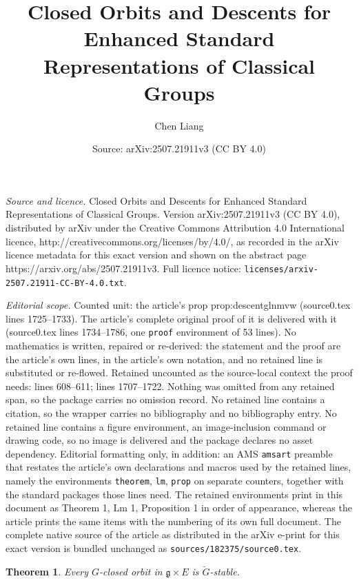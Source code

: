 \documentclass[10pt,a4paper]{amsart}
\title{Closed Orbits and Descents for Enhanced Standard Representations of Classical Groups}
\author{Chen Liang}
\date{Source: arXiv:2507.21911v3 (CC BY 4.0)}
\newtheorem{theorem}{Theorem}
\newcommand{\g}{\mathfrak g}
\begin{document}
\maketitle

\noindent\emph{Source and licence.} Closed Orbits and Descents for Enhanced Standard Representations of Classical Groups. Version arXiv:2507.21911v3 (CC BY 4.0), distributed by arXiv under the Creative Commons Attribution 4.0 International licence, http://creativecommons.org/licenses/by/4.0/, as recorded in the arXiv licence metadata for this exact version and shown on the abstract page https://arxiv.org/abs/2507.21911v3. Full licence notice: \texttt{licenses/arxiv-2507.21911-CC-BY-4.0.txt}.\par\smallskip

\noindent\textit{Editorial scope.} Counted unit: the article's prop prop:descentglnmvw (source0.tex lines 1725--1733). The article's complete original proof of it is delivered with it (source0.tex lines 1734--1786, one \texttt{proof} environment of 53 lines). No mathematics is written, repaired or re-derived: the statement and the proof are the article's own lines, in the article's own notation, and no retained line is substituted or re-flowed.  Retained uncounted as the source-local context the proof needs: lines 608--611; lines 1707--1722.  Nothing was omitted from any retained span, so the package carries no omission record.  No retained line contains a citation, so the wrapper carries no bibliography and no bibliography entry.  No retained line contains a figure environment, an image-inclusion command or drawing code, so no image is delivered and the package declares no asset dependency.  Editorial formatting only, in addition: an AMS \texttt{amsart} preamble that restates the article's own declarations and macros used by the retained lines, namely the environments \texttt{theorem}, \texttt{lm}, \texttt{prop} on separate counters, together with the standard packages those lines need.  The retained environments print in this document as Theorem 1, Lm 1, Proposition 1 in order of appearance, whereas the article prints the same items with the numbering of its own full document.  The complete native source of the article as distributed in the arXiv e-print for this exact version is bundled unchanged as \texttt{sources/182375/source0.tex}.
    \begin{theorem}
		\label{thm:closedorbitsmvw}
        Every $G$-closed orbit in $\g\times E$ is $\breve{G}$-stable.
	\end{theorem}
\end{document}
